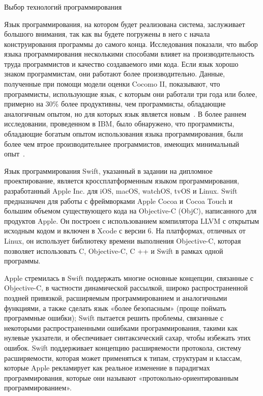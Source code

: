 \subsubsection{} Выбор технологий программирования
\label{sec:subject:specification:language}

Язык программирования, на котором будет реализована система, заслуживает большого внимания, так как вы будете погружены в него с начала конструирования программы до самого конца. Исследования показали, что выбор языка программирования несколькими способами влияет на производительность труда программистов и качество создаваемого ими кода. Если язык хорошо знаком программистам, они работают более производительно. Данные, полученные при помощи модели оценки Cocomo II, показывают, что программисты, использующие язык, с которым они работали три года или более, примерно на 30\% более продуктивны, чем программисты, обладающие аналогичным опытом, но для которых язык является новым~\cite{software_cost_estimation}. В более раннем исследовании, проведенном в IBM, было обнаружено, что программисты, обладающие богатым опытом использования языка программирования, были более чем втрое производительнее программистов, имеющих минимальный опыт~\cite{method_of_programming_measurement_and_estimation}.

Язык программирования Swift, указанный в задании на дипломное проектирование, является кроссплатформенным языком программирования, разработанный Apple Inc. для iOS, macOS, watchOS, tvOS и Linux. Swift предназначен для работы с фреймворками Apple Cocoa и Cocoa Touch и большим объемом существующего кода на  Objective-C (ObjC), написанного для продуктов Apple. Он построен с использованием компилятора LLVM с открытым исходным кодом и включен в Xcode с версии 6. На платформах, отличных от Linux, он использует библиотеку времени выполнения Objective-C, которая позволяет использовать C, Objective-C, C ++ и Swift в рамках одной программы.

Apple стремилась в Swift поддержать многие основные концепции, связанные с Objective-C, в частности динамической рассылкой, широко распространенной поздней привязкой, расширяемым программированием и аналогичными функциями, а также сделать язык «более безопасным» (проще поймать программные ошибки); Swift пытается решить проблемы, связанные с некоторыми распространенными ошибками программирования, такими как нулевые указатели, и обеспечивает синтаксический сахар, чтобы избежать этих ошибок. Swift поддерживает концепцию расширяемости протокола, систему расширяемости, которая может применяться к типам, структурам и классам, которые Apple рекламирует как реальное изменение в парадигмах программирования, которые они называют «протокольно-ориентированным программированием».

